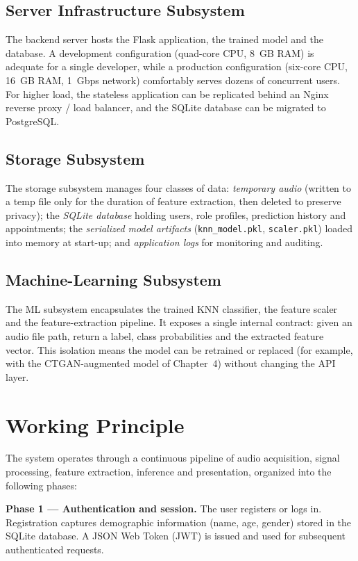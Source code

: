 \documentclass[oneside,a4paper,12pt]{report}
\begin{document}
\subsection{Server Infrastructure Subsystem}
The backend server hosts the Flask application, the trained model and the database.
A development configuration (quad-core CPU, 8~GB RAM) is adequate for a single
developer, while a production configuration (six-core CPU, 16~GB RAM, 1~Gbps
network) comfortably serves dozens of concurrent users. For higher load, the
stateless application can be replicated behind an Nginx reverse proxy / load
balancer, and the SQLite database can be migrated to PostgreSQL.

\subsection{Storage Subsystem}
The storage subsystem manages four classes of data: \emph{temporary audio}
(written to a temp file only for the duration of feature extraction, then deleted
to preserve privacy); the \emph{SQLite database} holding users, role profiles,
prediction history and appointments; the \emph{serialized model artifacts}
(\texttt{knn\_model.pkl}, \texttt{scaler.pkl}) loaded into memory at start-up; and
\emph{application logs} for monitoring and auditing.

\subsection{Machine-Learning Subsystem}
The ML subsystem encapsulates the trained KNN classifier, the feature scaler and
the feature-extraction pipeline. It exposes a single internal contract: given an
audio file path, return a label, class probabilities and the extracted feature
vector. This isolation means the model can be retrained or replaced (for example,
with the CTGAN-augmented model of Chapter~4) without changing the API layer.

\section{Working Principle}
The system operates through a continuous pipeline of audio acquisition, signal
processing, feature extraction, inference and presentation, organized into the
following phases:

\textbf{Phase 1 --- Authentication and session.} The user registers or logs in.
Registration captures demographic information (name, age, gender) stored in the
SQLite database. A JSON Web Token (JWT) is issued and used for subsequent
authenticated requests.
\end{document}
